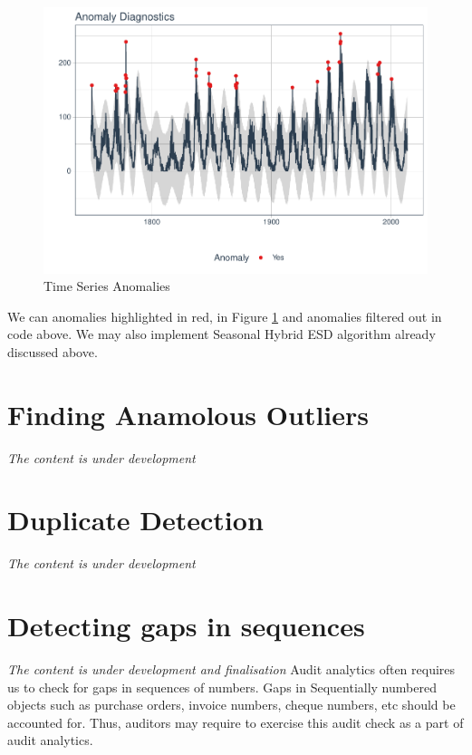 \documentclass[
]{book}
\begin{document}
\begin{figure}

{\centering \includegraphics[width=0.9\linewidth]{DauR_files/figure-latex/an17-1} 

}

\caption{Time Series Anomalies}\label{fig:an17}
\end{figure}

We can anomalies highlighted in red, in Figure \ref{fig:an17} and anomalies filtered out in code above. We may also implement Seasonal Hybrid ESD algorithm already discussed above.

\hypertarget{finding-anamolous-outliers}{%
\chapter{Finding Anamolous Outliers}\label{finding-anamolous-outliers}}

\emph{The content is under development}

\hypertarget{duplicate-detection}{%
\chapter{Duplicate Detection}\label{duplicate-detection}}

\emph{The content is under development}

\hypertarget{detecting-gaps-in-sequences}{%
\chapter{Detecting gaps in sequences}\label{detecting-gaps-in-sequences}}

\emph{The content is under development and finalisation}
Audit analytics often requires us to check for gaps in sequences of numbers. Gaps in Sequentially numbered objects such as purchase orders, invoice numbers, cheque numbers, etc should be accounted for. Thus, auditors may require to exercise this audit check as a part of audit analytics.
\end{document}
